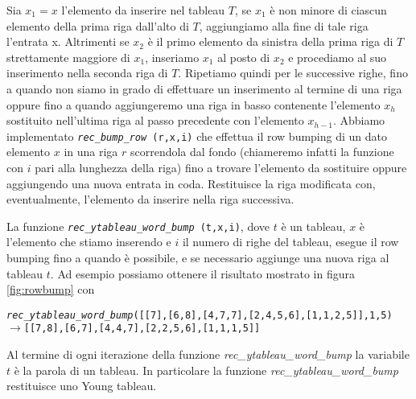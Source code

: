 Sia $x_1 = x$ l'elemento da inserire nel tableau $T$, se $x_1$ \`e non 
minore di ciascun elemento della prima riga
dall'alto di $T$, aggiungiamo alla fine di tale riga l'entrata x.
Altrimenti se $x_2$ \`e il primo elemento da sinistra della prima riga
di $T$ strettamente maggiore di $x_1$, inseriamo $x_1$ al posto di
$x_2$ e procediamo al suo inserimento nella seconda riga di $T$.
Ripetiamo quindi per le successive righe, fino a quando non siamo in
grado di effettuare un inserimento al termine di una riga oppure fino
a quando aggiungeremo una riga in basso contenente l'elemento $x_h$
sostituito nell'ultima riga al passo precedente con l'elemento
$x_{h-1}$.
Abbiamo implementato \texttt{\emph{rec\_bump\_row} (r,x,i)} che effettua il row bumping di un dato
elemento $x$ in una riga $r$ scorrendola dal fondo (chiameremo infatti
la funzione con $i$ pari alla lunghezza della riga) fino a trovare
l'elemento da sostituire oppure aggiungendo una nuova entrata in coda.
Restituisce la riga modificata con, eventualmente, l'elemento da
inserire nella riga successiva.

La funzione \texttt{\emph{rec\_ytableau\_word\_bump} (t,x,i)}, dove
$t$ \`e un tableau, $x$ \`e l'elemento che stiamo inserendo e $i$ il
numero di righe del tableau, esegue il row bumping
fino a quando \`e possibile, e se necessario aggiunge una nuova riga
al tableau $t$. Ad esempio possiamo ottenere il risultato mostrato in
figura \ref{fig:rowbump} con

\begin{alltt}
\emph{rec\_ytableau\_word\_bump} ([[7],[6,8],[4,7,7],[2,4,5,6],[1,1,2,5]], 1, 5)
\(\rightarrow\) [[7,8],[6,7],[4,4,7],[2,2,5,6],[1,1,1,5]]
\end{alltt}

\begin{oss}
Al termine di ogni iterazione della funzione
\emph{rec\_ytableau\_word\_bump} la variabile $t$ \`e la parola di un
tableau. In particolare la funzione \emph{rec\_ytableau\_word\_bump}
restituisce uno Young tableau.
\end{oss}

